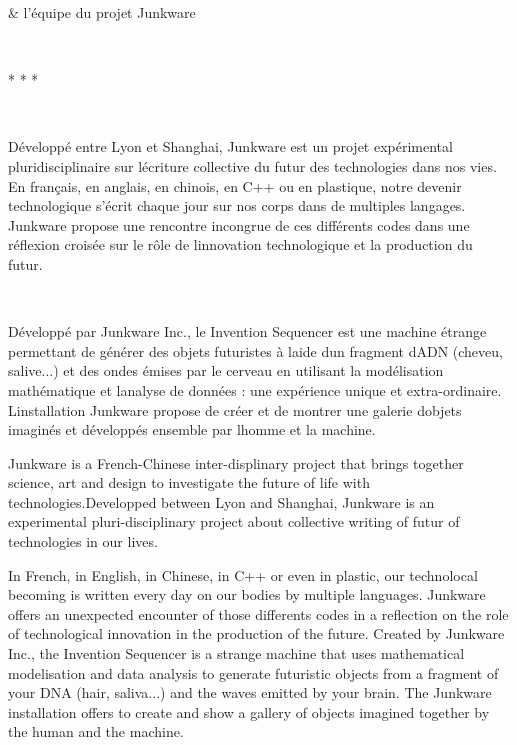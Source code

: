 \& l{\textquoteright}\'equipe du projet Junkware

~

{\centering
* * *
\par}

~

D\'evelopp\'e entre Lyon et Shanghai, Junkware est un projet
exp\'erimental pluridisciplinaire sur l{\textquotesingle}\'ecriture
collective du futur des technologies dans nos vies. En fran\c{c}ais, en
anglais, en chinois, en C++ ou en plastique, notre devenir
technologique s{\textquoteright}\'ecrit chaque jour sur nos corps dans
de multiples langages. Junkware propose une rencontre incongrue de ces
diff\'erents {\textquotedbl}codes{\textquotedbl} dans une r\'eflexion
crois\'ee sur le r\^ole de l{\textquotesingle}innovation technologique
et la production du futur.

~

D\'evelopp\'e par Junkware Inc., le Invention Sequencer est une machine
\'etrange permettant de g\'en\'erer des objets futuristes \`a
l{\textquotesingle}aide d{\textquotesingle}un fragment
d{\textquotesingle}ADN (cheveu, salive...) et des ondes \'emises par le
cerveau en utilisant la mod\'elisation math\'ematique et
l{\textquotesingle}analyse de donn\'ees : une exp\'erience unique et
extra-ordinaire. L{\textquotesingle}installation Junkware propose de
cr\'eer et de montrer une galerie d{\textquotesingle}objets imagin\'es
et d\'evelopp\'es ensemble par l{\textquotesingle}homme et la machine.

Junkware is a French-Chinese inter-displinary project that brings
together science, art and design to investigate the future of life with
technologies.Developped between Lyon and Shanghai, Junkware is an
experimental pluri-disciplinary project about collective writing of
futur of technologies in our lives.

In French, in English, in Chinese, in C++ or even in plastic, our
technolocal becoming is written every day on our bodies by multiple
languages. Junkware offers an unexpected encounter of those differents
{\textquotedbl}codes{\textquotedbl} in a reflection on the role of
technological innovation in the production of the future.\newline
Created by Junkware Inc., the Invention Sequencer is a strange machine
that uses mathematical modelisation and data analysis to generate
futuristic objects from a fragment of your DNA (hair, saliva...) and
the waves emitted by your brain. The Junkware installation offers to
create and show a gallery of objects imagined together by the human and
the machine.\newline
\newline
